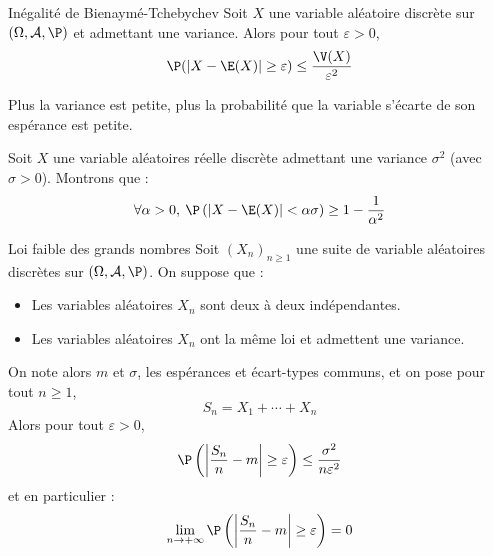 \documentclass[french,11pt,twoside]{VcCours}
\begin{document}
\begin{Theoreme}{Inégalité de Bienaymé-Tchebychev}
Soit $X$ une variable aléatoire discrète sur $(\Omega, \mathcal{A}, \P)$ et admettant une variance. Alors pour tout $\varepsilon>0$,
$$ \P( \vert X- \E(X) \vert \geq \varepsilon) \leq \dfrac{\V(X)}{\varepsilon^2}$$
\end{Theoreme}

\begin{Demonstration}{}
\vspace*{5cm}
\end{Demonstration}

\begin{Remarque}{} Plus la variance est petite, plus la probabilité que la variable s'écarte de son espérance est petite.
\end{Remarque}

\begin{Exemple}{} Soit $X$ une variable aléatoires réelle discrète admettant une variance $\sigma^{2}$ (avec $\sigma > 0$). Montrons que :
  \[
  \forall \alpha > 0,\:\P\left(\vert X - \E(X) \vert < \alpha \sigma \right) \geq 1 - \frac{1}{\alpha^{2}}
  \]
  
 \vspace*{5cm}
\end{Exemple}

\begin{Theoreme}{Loi faible des grands nombres} Soit $(X_n)_{n \geq 1}$ une suite de variable aléatoires discrètes sur $(\Omega, \mathcal{A}, \P)$. On suppose que :
\begin{itemize}
\item Les variables aléatoires $X_n$ sont deux à deux indépendantes.
\item Les variables aléatoires $X_n$ ont la même loi et admettent une variance.
\end{itemize}
On note alors $m$ et $\sigma$, les espérances et écart-types communs, et on pose pour tout $n \geq 1$,
$$ S_n = X_1 + \cdots + X_n$$
Alors pour tout $\varepsilon>0$,
$$ \P \left( \left\vert \dfrac{S_n}{n}-m \right\vert  \geq \varepsilon \right) \leq \dfrac{\sigma^2}{n \varepsilon^2}$$
et en particulier :
$$ \lim_{n \rightarrow + \infty} \P \left( \left\vert \dfrac{S_n}{n}-m \right\vert  \geq \varepsilon \right) = 0$$
\end{Theoreme}

\begin{Demonstration}{}

\vspace*{10cm}
\end{Demonstration}
\end{document}
